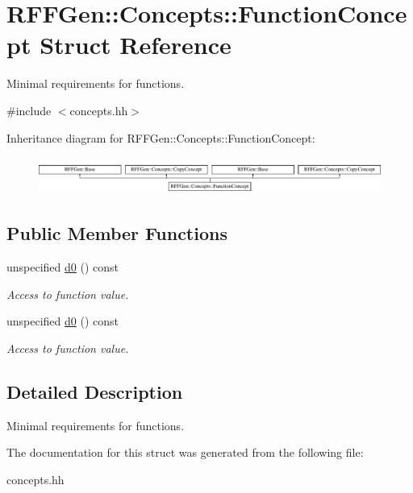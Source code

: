 \hypertarget{structRFFGen_1_1Concepts_1_1FunctionConcept}{\section{R\-F\-F\-Gen\-:\-:Concepts\-:\-:Function\-Concept Struct Reference}
\label{structRFFGen_1_1Concepts_1_1FunctionConcept}
}


Minimal requirements for functions.  




{\ttfamily \#include $<$concepts.\-hh$>$}

Inheritance diagram for R\-F\-F\-Gen\-:\-:Concepts\-:\-:Function\-Concept\-:\begin{figure}[H]
\begin{center}
\leavevmode
\includegraphics[height=1.228070cm]{structRFFGen_1_1Concepts_1_1FunctionConcept}
\end{center}
\end{figure}
\subsection*{Public Member Functions}
\begin{DoxyCompactItemize}
\item 
\hypertarget{structRFFGen_1_1Concepts_1_1FunctionConcept_a6006207e743a93b96d2d603b8b75bd7c}{unspecified \hyperlink{structRFFGen_1_1Concepts_1_1FunctionConcept_a6006207e743a93b96d2d603b8b75bd7c}{d0} () const }\label{structRFFGen_1_1Concepts_1_1FunctionConcept_a6006207e743a93b96d2d603b8b75bd7c}

\begin{DoxyCompactList}\small\item\em Access to function value. \end{DoxyCompactList}\item 
\hypertarget{structRFFGen_1_1Concepts_1_1FunctionConcept_a6006207e743a93b96d2d603b8b75bd7c}{unspecified \hyperlink{structRFFGen_1_1Concepts_1_1FunctionConcept_a6006207e743a93b96d2d603b8b75bd7c}{d0} () const }\label{structRFFGen_1_1Concepts_1_1FunctionConcept_a6006207e743a93b96d2d603b8b75bd7c}

\begin{DoxyCompactList}\small\item\em Access to function value. \end{DoxyCompactList}\end{DoxyCompactItemize}


\subsection{Detailed Description}
Minimal requirements for functions. 

The documentation for this struct was generated from the following file\-:\begin{DoxyCompactItemize}
\item 
concepts.\-hh\end{DoxyCompactItemize}
